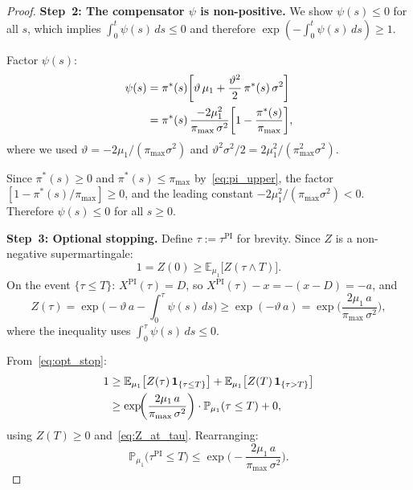 \documentclass[12pt]{article}
\theoremstyle{remark}
\theoremstyle{definition}
\newcommand{\E}{\mathbb{E}}
\newcommand{\Prob}{\mathbb{P}}
\newcommand{\PI}{\mathrm{PI}}
\begin{document}
\begin{proof}
\medskip
\noindent\textbf{Step~2: The compensator $\psi$ is non-positive.}
We show $\psi(s) \le 0$ for all $s$, which implies
$\int_0^t \psi(s)\,ds \le 0$ and therefore
$\exp(-\int_0^t \psi(s)\,ds) \ge 1$.

Factor $\psi(s)$:
\begin{align}
  \psi(s)
  &= \pi^*(s)\biggl[
    \vartheta\,\mu_1
    + \frac{\vartheta^2}{2}\,\pi^*(s)\,\sigma^2
  \biggr] \notag \\
  &= \pi^*(s)\,\frac{-2\mu_1^2}{\pi_{\max}\,\sigma^2}
    \biggl[1 - \frac{\pi^*(s)}{\pi_{\max}}\biggr],
  \label{eq:psi_factored}
\end{align}
where we used $\vartheta = -2\mu_1/(\pi_{\max}\sigma^2)$ and
$\vartheta^2\sigma^2/2 = 2\mu_1^2/(\pi_{\max}^2\sigma^2)$.

Since $\pi^*(s) \ge 0$ and $\pi^*(s) \le \pi_{\max}$ by~\eqref{eq:pi_upper},
the factor $[1 - \pi^*(s)/\pi_{\max}] \ge 0$, and the leading constant
$-2\mu_1^2/(\pi_{\max}\sigma^2) < 0$.
Therefore $\psi(s) \le 0$ for all $s \ge 0$.

\medskip
\noindent\textbf{Step~3: Optional stopping.}
Define $\tau := \tau^{\PI}$ for brevity.
Since $Z$ is a non-negative supermartingale:
\begin{equation}\label{eq:opt_stop}
  1 = Z(0) \ge \E_{\mu_1}\bigl[Z(\tau \wedge T)\bigr].
\end{equation}
On the event $\{\tau \le T\}$:
$X^{\PI}(\tau) = D$, so $X^{\PI}(\tau) - x = -(x-D) = -a$, and
\begin{equation}\label{eq:Z_at_tau}
  Z(\tau)
  = \exp\!\bigl(-\vartheta\,a - \textstyle\int_0^{\tau} \psi(s)\,ds\bigr)
  \ge \exp(-\vartheta\,a)
  = \exp\!\biggl(\frac{2\mu_1\,a}{\pi_{\max}\,\sigma^2}\biggr),
\end{equation}
where the inequality uses $\int_0^{\tau} \psi(s)\,ds \le 0$.

From~\eqref{eq:opt_stop}:
\begin{align}
  1
  &\ge \E_{\mu_1}\bigl[Z(\tau)\,\mathbf{1}_{\{\tau \le T\}}\bigr]
     + \E_{\mu_1}\bigl[Z(T)\,\mathbf{1}_{\{\tau > T\}}\bigr]
  \notag \\
  &\ge \exp\!\biggl(\frac{2\mu_1\,a}{\pi_{\max}\,\sigma^2}\biggr)
    \cdot \Prob_{\mu_1}(\tau \le T)
    + 0,
  \label{eq:opt_stop_bound}
\end{align}
using $Z(T) \ge 0$ and~\eqref{eq:Z_at_tau}.
Rearranging:
\begin{equation}\label{eq:main_bound}
  \Prob_{\mu_1}\bigl(\tau^{\PI} \le T\bigr)
  \le \exp\!\biggl(-\frac{2\mu_1\,a}{\pi_{\max}\,\sigma^2}\biggr).
\end{equation}


\end{proof}
\end{document}
